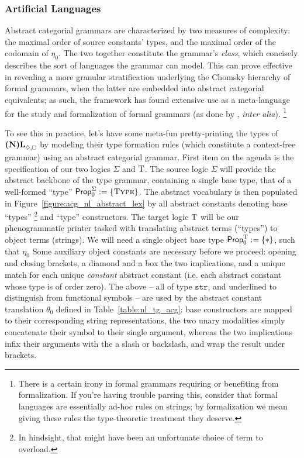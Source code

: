 \subsubsection{Artificial Languages}
Abstract categorial grammars are characterized by two measures of complexity: the maximal order of source constants' types, and the maximal order of the codomain of $\eta_0$.
The two together constitute the grammar's \textit{class}, which concisely describes the sort of languages the grammar can model.
This can prove effective in revealing a more granular stratification underlying the Chomsky hierarchy of formal grammars, when the latter are embedded into abstract categorial equivalents; as such, the framework has found extensive use as a meta-language for the study and formalization of formal grammars (as done by \citet{de2004expressive}, \textit{inter alia}).
\footnote{There is a certain irony in formal grammars requiring or benefiting from formalization. If you're having trouble parsing this, consider that formal languages are essentially ad-hoc rules on strings; by formalization we mean giving these rules the type-theoretic treatment they deserve.}

To see this in practice, let's have some meta-fun pretty-printing the types of $\logic{(N)L}_{\diamond, \bx}$ by modeling their type formation rules (which constitute a context-free grammar) using an abstract categorial grammar.
First item on the agenda is the specification of our two logics $\Sigma$ and $\mathrm{T}$.
The source logic $\Sigma$ will provide the abstract backbone of the type grammar, containing a single base type, that of a well-formed ``type'' 
$\propcon^{\Sigma} := \{ \type[s] \}$.
The abstract vocabulary is then populated in Figure~\ref{figure:acg_nl_abstract_lex} by all abstract constants denoting base ``types''%
\footnote{In hindsight, that might have been an unfortunate choice of term\textsuperscript{\thefootnote} to overload.} and ``type'' constructors.
The target logic $\mathrm{T}$ will be our phenogrammatic printer tasked with translating abstract terms (``types'') to object terms (strings).
We will need a single object base type  $\mathsf{Prop}_0^{\mathrm{T}} := \{ * \}$, such that $\eta_0$ 
Some auxiliary object constants are necessary before we proceed: opening and closing brackets, a diamond and a box the two implications, and a unique match for each unique \textit{constant} abstract constant (i.e. each abstract constant whose type is of order zero).
The above -- all of type $\mathtt{str}$, and underlined to distinguish from functional symbols -- are used by the abstract constant translation $\theta_0$ defined in Table~\ref{table:nl_tg_acg}: base constructors are mapped to their corresponding string representations, the two unary modalities simply concatenate their symbol to their single argument, whereas the two implications infix their arguments with the a slash or backslash, and wrap the result under brackets.

